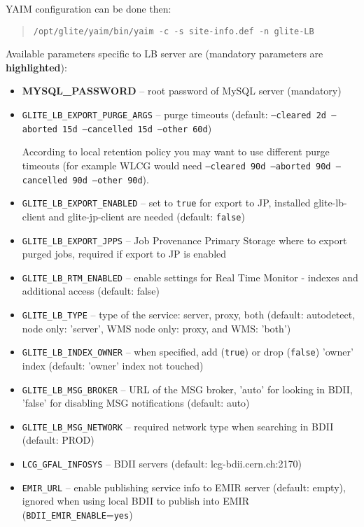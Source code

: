 YAIM configuration can be done then:

\begin{quote}
\texttt{/opt/glite/yaim/bin/yaim -c -s site-info.def -n glite-LB}
\end{quote}

Available parameters specific to LB server are (mandatory parameters are \textbf{highlighted}):

\begin{itemize}
\item \textbf{MYSQL\_PASSWORD} -- root password of MySQL server (mandatory)
\item \texttt{GLITE\_LB\_EXPORT\_PURGE\_ARGS} -- purge timeouts (default: \texttt{--cleared 2d --aborted 15d --cancelled 15d --other 60d})

According to local retention policy you may want to use different purge timeouts (for example WLCG would need \texttt{--cleared 90d --aborted 90d --cancelled 90d --other 90d}).
\item \texttt{GLITE\_LB\_EXPORT\_ENABLED} -- set to \texttt{true} for export to JP, installed glite-lb-client and glite-jp-client are needed (default: \texttt{false})
\item \texttt{GLITE\_LB\_EXPORT\_JPPS} -- Job Provenance Primary Storage where to export purged jobs, required if export to JP is enabled
\item \texttt{GLITE\_LB\_RTM\_ENABLED} -- enable settings for Real Time Monitor - indexes and additional access (default: false)
\item \texttt{GLITE\_LB\_TYPE} -- type of the \LB service: server, proxy, both (default: autodetect, \LB node only: 'server', WMS node only: proxy, \LB and WMS: 'both')
\item \texttt{GLITE\_LB\_INDEX\_OWNER} -- when specified, add (\texttt{true}) or drop (\texttt{false}) 'owner' index (default: 'owner' index not touched)
\item \texttt{GLITE\_LB\_MSG\_BROKER} -- URL of the MSG broker, 'auto' for looking in BDII, 'false' for disabling MSG notifications (default: auto)
\item \texttt{GLITE\_LB\_MSG\_NETWORK} -- required network type when searching in BDII (default: PROD)
\item \texttt{LCG\_GFAL\_INFOSYS} -- BDII servers (default: lcg-bdii.cern.ch:2170)
\item \texttt{EMIR\_URL} -- enable publishing \LB service info to EMIR server (default: empty), ignored when using local BDII to publish into EMIR (\texttt{BDII\_EMIR\_ENABLE}=\texttt{yes})
\end{itemize}

